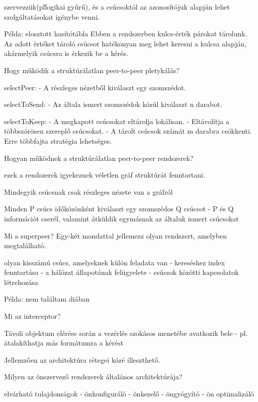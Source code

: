 \documentclass[twoside, a4paper, 12pt]{article}
\begin{document}
\begin{description}
        szervezzük(pl\. logikai gyűrű),
        és a csúcsoktól az azonosítójuk alapján lehet szolgáltatásokat igénybe venni.
    \item Példa: elosztott hasítótábla Ebben a rendszerben kulcs-érték párokat tárolunk.
        Az adott értéket tároló csúcsot hatékonyan meg lehet keresni a kulcsa alapján, akármelyik csúcsra
        is érkezik be a kérés.
    \item Hogy működik a struktúrálatlan peer-to-peer pletykálás?
    \item selectPeer:
        - A részleges nézetből kiválaszt egy szomszédot.
    \item selectToSend: 
        - Az általa ismert szomszédok közül kiválaszt n darabot.
    \item selectToKeep:
        - A megkapott csúcsokat eltárolja lokálisan.
        - Eltávolítja a többszörösen szereplő csúcsokat.
        - A tárolt csúcsok számát m darabra csökkenti. Erre többfajta stratégia lehetséges.
    \item Hogyan működnek a struktúrálatlan peer-to-peer rendszerek?
    \item ezek a rendszerek igyekeznek véletlen gráf struktúrát fenntartani.
    \item Mindegyik csúcsnak csak részleges nézete van a gráfról 
    \item Minden P csúcs időközönként kiválaszt egy szomszédos Q csúcsot
        - P és Q információt cserél, valamint átküldik egymásnak az általuk ismert csúcsokat
    \item  Mi a superpeer? Egy-két mondattal jellemezz olyan rendszert, amelyben megtalálható.
    \item olyan kisszámú csúcs, amelyeknek külön feladata van
        - kereséshez index fenntartása
        - a hálózat állapotának felügyelete
        - csúcsok közötti kapcsolatok létrehozása
    \item Példa: nem találtam diában
    \item  Mi az interceptor?
    \item Távoli objektum elérése során a vezérlés szokásos menetébe avatkozik bele
        - pl. átalakíthatja más formátumra a kérést
    \item Jellemzően az architektúra rétegei közé illeszthető.
    \item  Milyen az önszervező rendszerek általános architektúrája?
    \item elvárható tulajdonságok
        - önkonfiguráló
        - önkezelő
        - öngyógyító
        - ön optimalizáló

\end{description}
\end{document}

